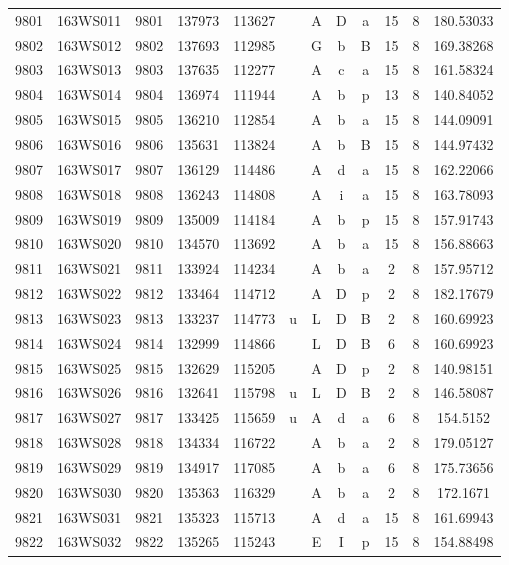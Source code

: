 \begin{tabular}{|*{12}{c|}}
9801 & 163WS011 & 9801 & 137973 & 113627 &  & A & D & a & 15 & 8 & 180.53033 \\ 
9802 & 163WS012 & 9802 & 137693 & 112985 &  & G & b & B & 15 & 8 & 169.38268 \\ 
9803 & 163WS013 & 9803 & 137635 & 112277 &  & A & c & a & 15 & 8 & 161.58324 \\ 
9804 & 163WS014 & 9804 & 136974 & 111944 &  & A & b & p & 13 & 8 & 140.84052 \\ 
9805 & 163WS015 & 9805 & 136210 & 112854 &  & A & b & a & 15 & 8 & 144.09091 \\ 
9806 & 163WS016 & 9806 & 135631 & 113824 &  & A & b & B & 15 & 8 & 144.97432 \\ 
9807 & 163WS017 & 9807 & 136129 & 114486 &  & A & d & a & 15 & 8 & 162.22066 \\ 
9808 & 163WS018 & 9808 & 136243 & 114808 &  & A & i & a & 15 & 8 & 163.78093 \\ 
9809 & 163WS019 & 9809 & 135009 & 114184 &  & A & b & p & 15 & 8 & 157.91743 \\ 
9810 & 163WS020 & 9810 & 134570 & 113692 &  & A & b & a & 15 & 8 & 156.88663 \\ 
9811 & 163WS021 & 9811 & 133924 & 114234 &  & A & b & a & 2 & 8 & 157.95712 \\ 
9812 & 163WS022 & 9812 & 133464 & 114712 &  & A & D & p & 2 & 8 & 182.17679 \\ 
9813 & 163WS023 & 9813 & 133237 & 114773 & u & L & D & B & 2 & 8 & 160.69923 \\ 
9814 & 163WS024 & 9814 & 132999 & 114866 &  & L & D & B & 6 & 8 & 160.69923 \\ 
9815 & 163WS025 & 9815 & 132629 & 115205 &  & A & D & p & 2 & 8 & 140.98151 \\ 
9816 & 163WS026 & 9816 & 132641 & 115798 & u & L & D & B & 2 & 8 & 146.58087 \\ 
9817 & 163WS027 & 9817 & 133425 & 115659 & u & A & d & a & 6 & 8 & 154.5152 \\ 
9818 & 163WS028 & 9818 & 134334 & 116722 &  & A & b & a & 2 & 8 & 179.05127 \\ 
9819 & 163WS029 & 9819 & 134917 & 117085 &  & A & b & a & 6 & 8 & 175.73656 \\ 
9820 & 163WS030 & 9820 & 135363 & 116329 &  & A & b & a & 2 & 8 & 172.1671 \\ 
9821 & 163WS031 & 9821 & 135323 & 115713 &  & A & d & a & 15 & 8 & 161.69943 \\ 
9822 & 163WS032 & 9822 & 135265 & 115243 &  & E & I & p & 15 & 8 & 154.88498 \\ 

\end{tabular}

